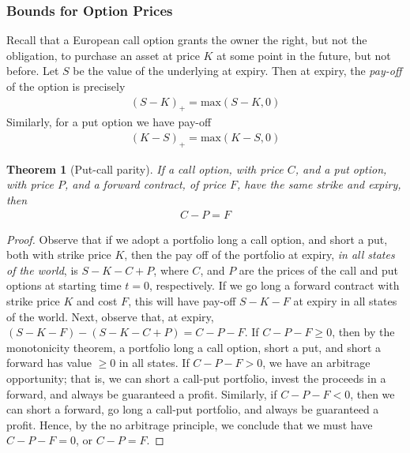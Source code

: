 \documentclass[12pt]{article}
\theoremstyle{plain}
\newtheorem{theorem}{Theorem}
\theoremstyle{definition}
\theoremstyle{remark}
\numberwithin{equation}{section}  %
\begin{document}
\subsubsection{Bounds for Option Prices}
Recall that a European call option grants the owner the right, but not the obligation, to purchase an asset at price $K$ at some point in the future, but not before. 
Let $S$ be the value of the underlying at expiry. Then at expiry, the \emph{pay-off} of the option is precisely
\begin{equation*}
\begin{split}
    {(S - K)}_{+} = \text{max}(S - K, 0)
\end{split}
\end{equation*}
Similarly, for a put option we have pay-off
\begin{equation*}
\begin{split}
    {(K - S)}_{+} = \text{max}(K - S, 0)
\end{split}
\end{equation*}
\begin{theorem}[Put-call parity]
If a call option, with price $C$, and a put option, with price $P$, and a forward contract, of price $F$, have the same strike and expiry, then
\begin{equation*}
\begin{split}
C - P = F
\end{split}
\end{equation*}
\label{thm:put-call}
\end{theorem}
\begin{proof}
    Observe that if we adopt a portfolio long a call option, and short a put,
    both with strike price $K$, then the pay off of the portfolio at expiry,
    \emph{in all states of the world}, is $S-K -C + P$, where $C$, and $P$ are
    the prices of the call and put options at starting time $t = 0$,
    respectively. If we go long a forward contract with strike price $K$ and
    cost $F$, this will have pay-off $S-K - F$ at expiry in all states of the
    world. 
    Next, observe that, at expiry, $(S - K - F) - (S - K - C + P) = C - P - F$.
    If $C - P - F \ge 0$, then by the monotonicity theorem, a portfolio long a
    call option, short a put, and short a forward has value $\ge 0$ in all
    states. If $C - P - F > 0$, we have an arbitrage opportunity; that is, we can short a call-put portfolio, invest the proceeds in a forward, and always be guaranteed a profit.
    Similarly, if $C - P - F < 0$, then we can short a forward, go long a call-put portfolio, and always be guaranteed a profit. Hence, by the no arbitrage principle, we
    conclude that we must have $C - P - F = 0$, or $C - P = F$. 
\end{proof}
\end{document}
